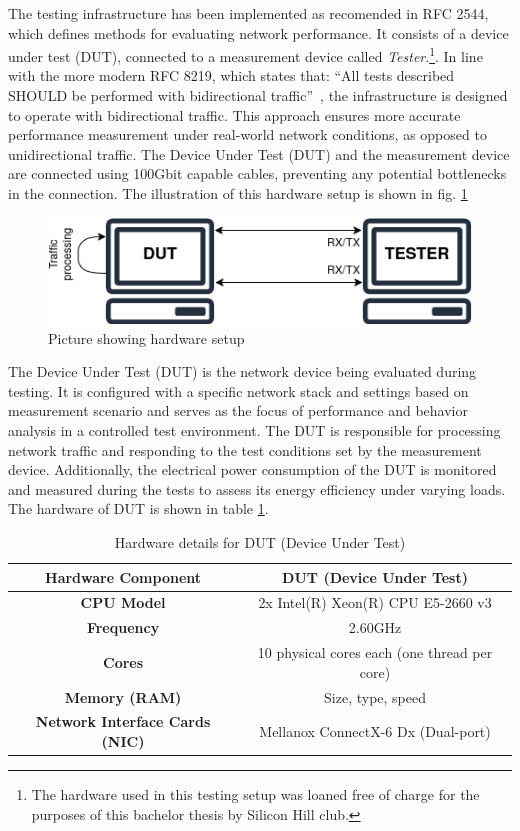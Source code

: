 The testing infrastructure has been implemented as recomended in RFC 2544, which defines methods for evaluating network performance. 
It consists of a device under test (DUT), connected to a measurement device called \textit{Tester}.\footnote{The hardware used in this testing setup was loaned free of charge for the purposes of this bachelor thesis by Silicon Hill club.}.
In line with the more modern RFC 8219, which states that: ``All tests described SHOULD be performed with bidirectional traffic''~\cite{RFC8219}, the infrastructure is designed to operate with bidirectional traffic. 
This approach ensures more accurate performance measurement under real-world network conditions, as opposed to unidirectional traffic.
The Device Under Test (DUT) and the measurement device are connected using 100Gbit capable cables, preventing any potential bottlenecks in the connection.
The illustration of this hardware setup is shown in fig. \ref{fig:hardware-setup}

\begin{figure}[!htbp]
    \centering
    \includegraphics[width=0.9\linewidth]{images/setup.png}
    \caption{Picture showing hardware setup}
    \label{fig:hardware-setup}
\end{figure}

The Device Under Test (DUT) is the network device being evaluated during testing. 
It is configured with a specific network stack and settings based on measurement scenario 
and serves as the focus of performance and behavior analysis in a controlled test environment. 
The DUT is responsible for processing network traffic and responding to the test conditions set by the measurement device.
Additionally, the electrical power consumption of the DUT is monitored and measured during the tests to assess its energy efficiency under varying loads.
The hardware of DUT is shown in table \ref{tab:hardware_dut}.

\begin{table}[h!]
\centering
\begin{tabular}{|c|c|}
\hline
\textbf{Hardware Component} & \textbf{DUT (Device Under Test)} \\
\hline
\textbf{CPU Model} & 2x Intel(R) Xeon(R) CPU E5-2660 v3 \\
\hline
\textbf{Frequency} & 2.60GHz \\
\hline
\textbf{Cores} & 10 physical cores each (one thread per core) \\
\hline
\textbf{Memory (RAM)} & Size, type, speed \\
\hline
\textbf{Network Interface Cards (NIC)} & Mellanox ConnectX-6 Dx (Dual-port) \\
\hline
\end{tabular}
\caption{Hardware details for DUT (Device Under Test)}
\label{tab:hardware_dut}
\end{table}

